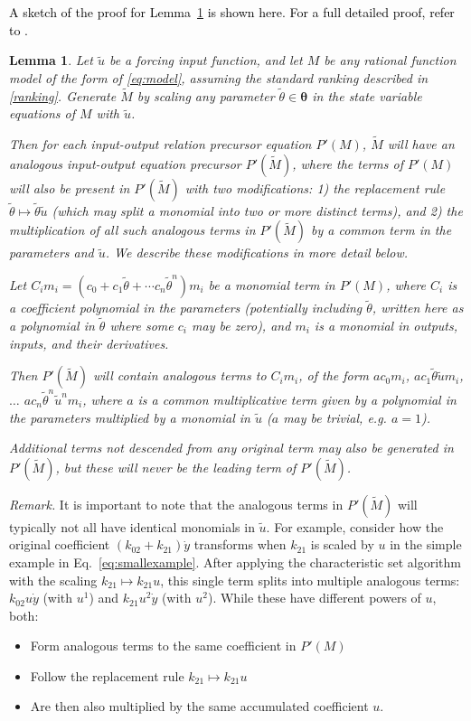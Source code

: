 \documentclass[a4paper,fleqn]{cas-dc}
\newtheorem{lemma}{Lemma}
\theoremstyle{definition}
\begin{document}
\textcolor{black}{A sketch of the proof for Lemma~\ref{newform} is shown here. For a full detailed proof, refer to .}

\begin{lemma} \label{newform} 
Let $\tilde{u}$ be a forcing input function, and let $M$ be any rational function model of the form of \cref{eq:model}, assuming the standard ranking described in \cref{ranking}. Generate $\tilde{M}$ by scaling any parameter $\tilde{\theta} \in \pmb{\theta}$ in the state variable equations of $M$ with $\tilde{u}$.
     
Then for each input-output relation precursor equation $P'(M)$, $\tilde{M}$ will have an analogous input-output equation precursor $P'(\tilde{M})$, where the terms of $P'(M)$ will also be present in $P'(\tilde{M})$ with two modifications: 1) the replacement rule $\tilde{\theta} \mapsto \tilde{\theta}\tilde{u}$ (which may split a monomial into two or more distinct terms), and 2) the multiplication of all such analogous terms in $P'(\tilde{M})$ by a common term in the parameters and $\tilde{u}$. We describe these modifications in more detail below.

Let $C_im_i = (c_0 + c_1\tilde{\theta} + \cdots c_n\tilde{\theta}^n)m_i$ be a monomial term in $P'(M)$, where $C_i$ is a coefficient polynomial in the parameters (potentially including $\tilde{\theta}$, written here as a polynomial in $\tilde{\theta}$ where some $c_i$ may be zero), and  $m_i$ is a monomial in outputs, inputs, and their derivatives. 

Then $P'(\tilde{M})$ will contain analogous terms to $C_im_i$, of the form $ac_0m_i$, $ac_1\tilde{\theta}\tilde{u}m_i$, $\dots$ $ac_n\tilde{\theta}^n\tilde{u}^nm_i$, where $a$ is a common multiplicative term given by a polynomial in the parameters multiplied by a monomial in $\tilde{u}$ ($a$ may be trivial, e.g. $a=1$).

Additional terms not descended from any original term may also be generated in $P'(\tilde{M})$, but these will never be the leading term of $P'(\tilde{M})$.

\end{lemma}


\noindent
\noindent \textit{Remark.} 
It is important to note that the analogous terms in $P'(\tilde{M})$ will typically not all have identical monomials in $\tilde{u}$. For example, consider how the original coefficient $(k_{02} + k_{21})\dot{y}$ transforms when $k_{21}$ is scaled by $u$ in the simple example in Eq.~\eqref{eq:smallexample}. After applying the characteristic set algorithm with the scaling $k_{21} \mapsto k_{21}u$, this single term splits into multiple analogous terms: $k_{02}u\dot{y}$ (with $u^1$) and $k_{21}u^2\dot{y}$ (with $u^2$). While these have different powers of $u$, both:
\begin{itemize}
\item Form analogous terms to the same coefficient in $P'(M)$
\item Follow the replacement rule $k_{21} \mapsto k_{21}u$
\item Are then also multiplied by the same accumulated  coefficient $u$.
\end{itemize}
\end{document}
